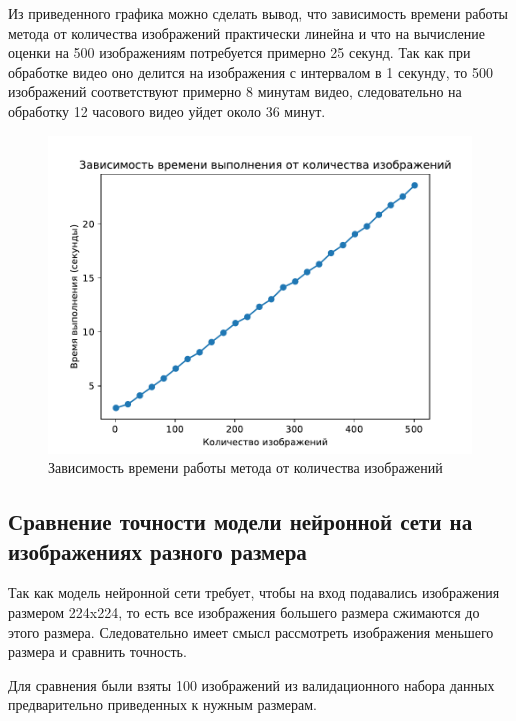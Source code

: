 Из приведенного графика можно сделать вывод, что зависимость времени работы метода от количества изображений практически линейна и что на вычисление оценки на 500 изображениям потребуется примерно 25 секунд. Так как при обработке видео оно делится на изображения с интервалом в 1 секунду, то 500 изображений соответствуют примерно 8 минутам видео, следовательно на обработку 12 часового видео уйдет около 36 минут.

\begin{figure}[hbtp]
	\centering
	\includegraphics[scale=0.8]{img/count_time_bench.pdf}
	\caption{Зависимость времени работы метода от количества изображений}
	\label{fig:count_time_bench}
\end{figure}
\clearpage

\subsection{Сравнение точности модели нейронной сети на изображениях разного размера}
Так как модель нейронной сети требует, чтобы на вход подавались изображения размером 224x224, то есть все изображения большего размера сжимаются до этого размера. Следовательно имеет смысл рассмотреть изображения меньшего размера и сравнить точность.
 
Для сравнения были взяты 100 изображений из валидационного набора данных предварительно приведенных к нужным размерам.

